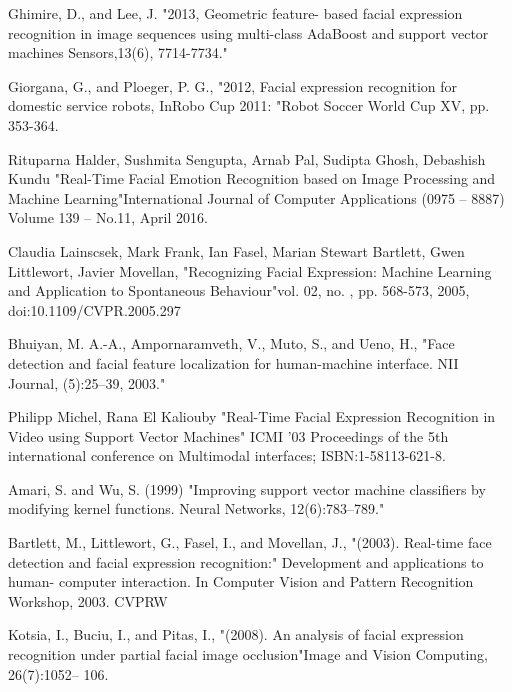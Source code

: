 \documentclass[a4paper,12pt,oneside]{article}
\begin{document}
\begin{thebibliography}{9}
Ghimire, D., and Lee, J. {"2013, Geometric feature-
based facial expression recognition in image sequences
using multi-class AdaBoost and support vector machines
Sensors,13(6), 7714-7734." }

 Giorgana, G., and Ploeger, P. G., {"2012, Facial
expression recognition for domestic service robots,
InRobo Cup 2011: "}Robot Soccer World Cup XV, pp.
353-364.

Rituparna Halder, Sushmita Sengupta, Arnab Pal,
Sudipta Ghosh, Debashish Kundu {"Real-Time Facial
Emotion Recognition based on Image Processing and
Machine Learning"}International Journal of Computer
Applications (0975 – 8887) Volume 139 – No.11, April
2016.

Claudia Lainscsek, Mark Frank, Ian Fasel, Marian
Stewart Bartlett, Gwen Littlewort, Javier Movellan, {"Recognizing Facial Expression: Machine Learning and
Application to Spontaneous Behaviour"}vol. 02, no. , pp.
568-573, 2005, doi:10.1109/CVPR.2005.297


 Bhuiyan, M. A.-A., Ampornaramveth, V., Muto, S.,
and Ueno, H., {"Face detection and facial feature
localization for human-machine interface. NII Journal,
(5):25–39, 2003."}


 Philipp Michel, Rana El Kaliouby
{"Real-Time
Facial Expression Recognition in Video using Support
Vector Machines"} ICMI '03 Proceedings of the 5th
international conference on Multimodal interfaces;
ISBN:1-58113-621-8.

 Amari, S. and Wu, S. (1999) {"Improving support
vector machine classifiers by modifying kernel
functions. Neural Networks, 12(6):783–789."}

 Bartlett, M., Littlewort, G., Fasel, I., and Movellan,
J., { "(2003). Real-time face detection and facial expression
recognition:" }Development and applications to human-
computer interaction. In Computer Vision and Pattern
Recognition Workshop, 2003. CVPRW

  Kotsia, I., Buciu, I., and Pitas, I., {"(2008). An analysis
of facial expression recognition under partial facial
image occlusion"}Image and Vision Computing,
26(7):1052– 106.





\end{thebibliography}
\end{document}
